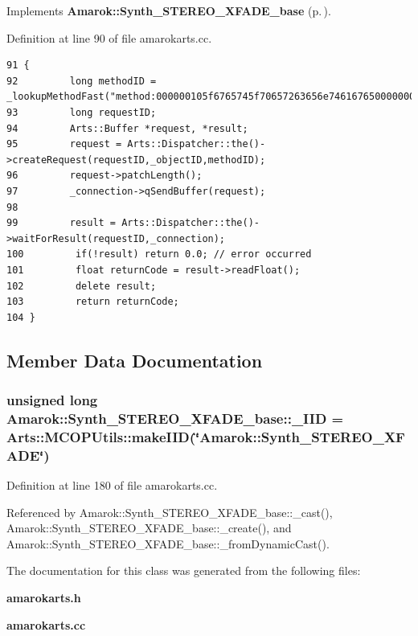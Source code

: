 Implements {\bf Amarok::Synth\_\-STEREO\_\-XFADE\_\-base} {\rm (p.\,\pageref{classAmarok_1_1Synth__STEREO__XFADE__base_Amarok_1_1Synth__STEREO__XFADE__skela9})}.

Definition at line 90 of file amarokarts.cc.



\footnotesize\begin{verbatim}91 {
92         long methodID = _lookupMethodFast("method:000000105f6765745f70657263656e746167650000000006666c6f617400000000020000000000000000");
93         long requestID;
94         Arts::Buffer *request, *result;
95         request = Arts::Dispatcher::the()->createRequest(requestID,_objectID,methodID);
96         request->patchLength();
97         _connection->qSendBuffer(request);
98 
99         result = Arts::Dispatcher::the()->waitForResult(requestID,_connection);
100         if(!result) return 0.0; // error occurred
101         float returnCode = result->readFloat();
102         delete result;
103         return returnCode;
104 }
\end{verbatim}\normalsize 


\subsection{Member Data Documentation}
\subsubsection{\setlength{\rightskip}{0pt plus 5cm}unsigned long {\bf Amarok::Synth\_\-STEREO\_\-XFADE\_\-base::\_\-IID} = Arts::MCOPUtils::make\-IID(\char`\"{}Amarok::Synth\_\-STEREO\_\-XFADE\char`\"{})\hspace{0.3cm}{\tt  [static, inherited]}}\label{classAmarok_1_1Synth__STEREO__XFADE__base_Amarok_1_1Synth__STEREO__XFADE__stubs0}




Definition at line 180 of file amarokarts.cc.

Referenced by Amarok::Synth\_\-STEREO\_\-XFADE\_\-base::\_\-cast(), Amarok::Synth\_\-STEREO\_\-XFADE\_\-base::\_\-create(), and Amarok::Synth\_\-STEREO\_\-XFADE\_\-base::\_\-from\-Dynamic\-Cast().

The documentation for this class was generated from the following files:\begin{CompactItemize}
\item 
{\bf amarokarts.h}\item 
{\bf amarokarts.cc}\end{CompactItemize}
